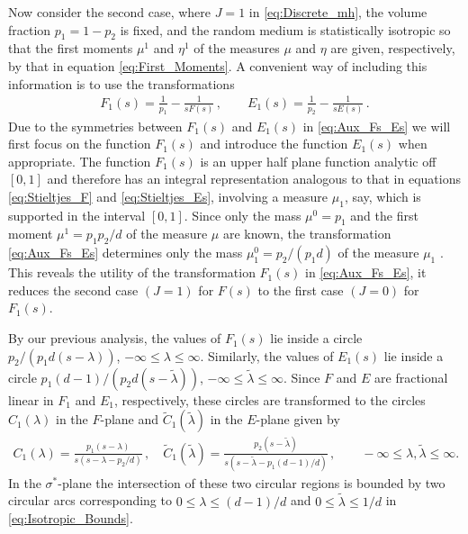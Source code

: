 \documentclass{cmslatex}
\begin{document}
Now consider the second case, where $J=1$ in \eqref{eq:Discrete_mh},
the volume fraction $p_1=1-p_2$ is fixed, and the random medium is
statistically isotropic so that the first moments $\mu^1$ and $\eta^1$ of
the measures $\mu$ and $\eta$ are given, respectively, by that in equation  
\eqref{eq:First_Moments}.  A convenient way of including this
information is to use the transformations \cite{Bergman:AP-78}
%
\begin{align}\label{eq:Aux_Fs_Es}
  F_1(s)=\frac{1}{p_1}-\frac{1}{sF(s)}\,, \qquad
  E_1(s)=\frac{1}{p_2}-\frac{1}{sE(s)}\,.
\end{align}
%
Due to the symmetries between $F_1(s)$ and $E_1(s)$ in
\eqref{eq:Aux_Fs_Es} we will first focus on the function $F_1(s)$ and
introduce the function $E_1(s)$ when appropriate. The function
$F_1(s)$ is an upper half plane function analytic off $[0,1]$ and
therefore has an integral representation
\cite{Bergman:AP-78,Golden:1986:BCP} analogous to that in equations
\eqref{eq:Stieltjes_F} and \eqref{eq:Stieltjes_Es}, involving a
measure $\mu_1$, say, which is supported in the interval $[0,1]$. Since
only the mass $\mu^0=p_1$ and the first moment $\mu^1=p_1p_2/d$ of the
measure $\mu$ are known, the transformation \eqref{eq:Aux_Fs_Es}
determines only the mass $\mu_1^0=p_2/(p_1d)$ of the measure $\mu_1$
\cite{Bergman:AP-78,Golden:1986:BCP}. This reveals the utility of the
transformation $F_1(s)$ in \eqref{eq:Aux_Fs_Es}, it reduces the second
case $(J=1)$ for $F(s)$ to the first case $(J=0)$ for $F_1(s)$.



By our previous analysis, the values of $F_1(s)$ lie inside a circle
$p_2/(p_1d(s-\lambda))$, $-\infty\leq\lambda\leq\infty$. Similarly, the values of $E_1(s)$ lie
inside a circle $p_1(d-1)/(p_2d(s-\tilde{\lambda}))$,
$-\infty\leq\tilde{\lambda}\leq\infty$. Since $F$ and $E$ are fractional linear in $F_1$ and
$E_1$, respectively, these circles are transformed to the circles
$C_1(\lambda)$ in the $F$-plane and $\tilde{C}_1(\tilde{\lambda})$ in the
$E$-plane given by \cite{Golden:1986:BCP}
%
\begin{align}\label{eq:Isotropic_Bounds}
  C_1(\lambda)=\frac{p_1(s-\lambda)}{s(s-\lambda-p_2/d)}\,, \quad  %
  \tilde{C}_1(\tilde{\lambda})=\frac{p_2(s-\tilde{\lambda})}{s(s-\tilde{\lambda}-p_1(d-1)/d)}\,,
   \qquad -\infty\leq\lambda,\tilde{\lambda}\leq\infty. %
\end{align}
%
In the $\sigma^*$-plane the intersection of these two circular regions is
bounded by two circular arcs \cite{Golden:1986:BCP} corresponding to
$0\leq\lambda\leq(d-1)/d$ and $0\leq\tilde{\lambda}\leq1/d$ in \eqref{eq:Isotropic_Bounds}.
\end{document}
